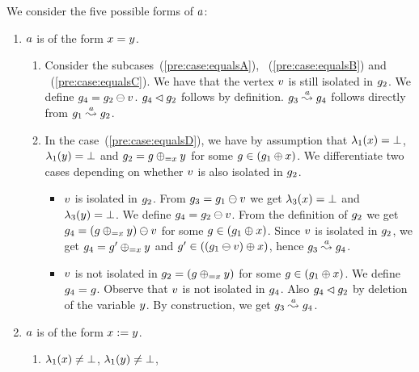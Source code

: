{\begin{enumerate}
We consider
the five possible forms of $a$:
%
\begin{enumerate}
\item $a$ is of the form $x=y$.
%
\begin{enumerate}
%
\item 
\label{pre:js:monotonic:lemma:equal:isolated}
Consider the subcases~(\ref{pre:case:equalsA}),
~(\ref{pre:case:equalsB}) and
~(\ref{pre:case:equalsC}).
%
We have that the vertex $v$ is still 
isolated in $g_2$.
%
We define $g_4=g_2\ominus{\ensuremath{v}}$.
%
$g_4\lhd g_2$ follows by definition.
%
$g_3\stackrel{a}{\leadsto}g_4$ 
follows directly from 
$g_1\stackrel{a}{\leadsto}g_2$.
%
\item In the case~(\ref{pre:case:equalsD}),
we have by assumption that 
$\lambda_1(x)=\bot$, 
$\lambda_1(y)=\bot$
and
$g_2=g\oplus_{={x}}{y}$ for some
$g\in\left(g_1\oplus{\ensuremath{x}}\right)$.
%
We differentiate two cases depending 
on whether $v$ is also isolated
in $g_2$.
%
\begin{itemize}
\item 
$v$ is isolated in $g_2$.
%
From $g_3=g_1\ominus{\ensuremath{v}}$
we get $\lambda_3(x)=\bot$ and 
$\lambda_3(y)=\bot$.
%
We define $g_4=g_2\ominus{\ensuremath{v}}$.
%
From the definition of $g_2$ we get 
$g_4=
(g\oplus_{={x}}{y})\ominus{\ensuremath{v}}$ 
for some
$g\in\left(g_1\oplus{\ensuremath{x}}\right)$.
%
Since $v$ is isolated in $g_2$, 
we get 
$g_4
=g'\oplus_{={x}}{y}$
and 
$g'
\in((g_1\ominus{\ensuremath{v}})\oplus{\ensuremath{x}})$, hence
$g_3\stackrel{a}{\leadsto}g_4$.
\item $v$ is not isolated in 
$g_2=(g\oplus_{={x}}{y})$ 
for some
$g\in\left(g_1\oplus{\ensuremath{x}}\right)$.
%
We define $g_4=g$.
%
Observe that $v$ is not isolated in 
$g_4$.
%
Also $g_4\lhd g_2$ by deletion of the
variable $y$.
%
By construction, we get 
$g_3\stackrel{a}{\leadsto}g_4$.
\end{itemize}
%
\end{enumerate}
%
\item $a$ is of the form $x:=y$.
%
  \begin{enumerate}
  \item \label{pre:case:assignedA}%
    $\lambda_1(x)\neq\bot$, %
    $\lambda_1(y)\neq\bot$, %

\end{enumerate}
\end{enumerate}
\end{enumerate}}
